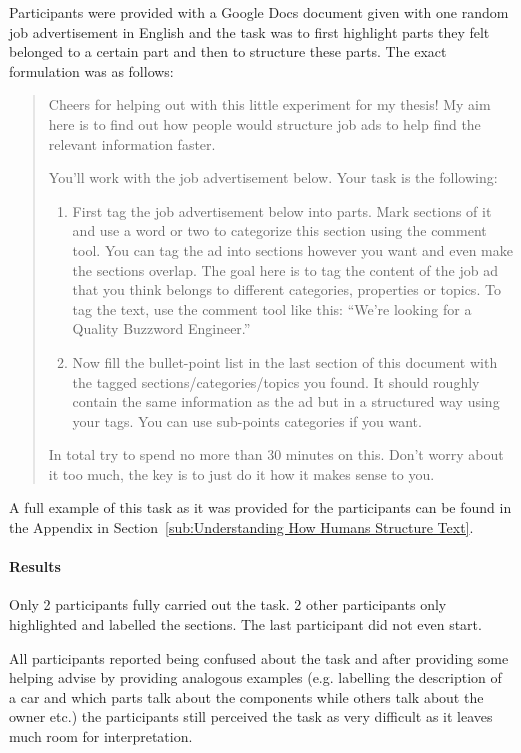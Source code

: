 Participants were provided with a \gls{Google Docs} document given with one random job advertisement in English and the task was to first highlight parts they felt belonged to a certain part and then to structure these parts. The exact formulation was as follows:

\blockquote{Cheers for helping out with this little experiment for my thesis! My aim here is to find out how people would structure job ads to help find the relevant information faster.

You'll work with the job advertisement below. Your task is the following:
\begin{enumerate}
  \item First tag the job advertisement below into parts. Mark sections of it and use a word or two to categorize this section using the comment tool. You can tag the ad into sections however you want and even make the sections overlap. The goal here is to tag the content of the job ad that you think belongs to different categories, properties or topics. To tag the text, use the comment tool like this: ``We're looking for a Quality Buzzword Engineer.''
  \item Now fill the bullet-point list in the last section of this document with the tagged sections/categories/topics you found. It should roughly contain the same information as the ad but in a structured way using your tags. You can use sub-points categories if you want.
\end{enumerate}
In total try to spend no more than 30 minutes on this. Don't worry about it too much, the key is to just do it how it makes sense to you.}

A full example of this task as it was provided for the participants can be found in the Appendix in Section~\ref{sub:Understanding How Humans Structure Text}.

\paragraph{Results}
\label{par:Results}

Only 2 participants fully carried out the task. 2 other participants only highlighted and labelled the sections. The last participant did not even start.

All participants reported being confused about the task and after providing some helping advise by providing analogous examples (e.g. labelling the description of a car and which parts talk about the components while others talk about the owner etc.) the participants still perceived the task as very difficult as it leaves much room for interpretation.

